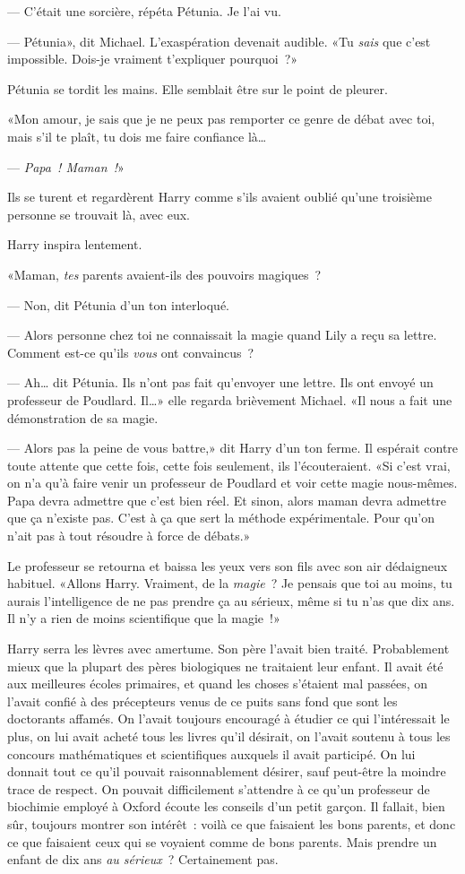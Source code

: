 --- C'était une sorcière, répéta Pétunia. Je l'ai vu.

--- Pétunia», dit Michael. L'exaspération devenait audible. «Tu \emph{sais} que c'est impossible. Dois-je vraiment t'expliquer pourquoi~?»

Pétunia se tordit les mains. Elle semblait être sur le point de pleurer.

«Mon amour, je sais que je ne peux pas remporter ce genre de débat avec toi, mais s'il te plaît, tu dois me faire confiance là…

--- \emph{Papa~! Maman~!}»

Ils se turent et regardèrent Harry comme s'ils avaient oublié qu'une troisième personne se trouvait là, avec eux.

Harry inspira lentement.

«Maman, \emph{tes} parents avaient-ils des pouvoirs magiques~?

--- Non, dit Pétunia d'un ton interloqué.

--- Alors personne chez toi ne connaissait la magie quand Lily a reçu sa lettre. Comment est-ce qu'ils \emph{vous} ont convaincus~?

--- Ah… dit Pétunia. Ils n'ont pas fait qu'envoyer une lettre. Ils ont envoyé un professeur de Poudlard. Il…» elle regarda brièvement Michael. «Il nous a fait une démonstration de sa magie.

--- Alors pas la peine de vous battre,» dit Harry d'un ton ferme. Il espérait contre toute attente que cette fois, cette fois seulement, ils l'écouteraient. «Si c'est vrai, on n'a qu'à faire venir un professeur de Poudlard et voir cette magie nous-mêmes. Papa devra admettre que c'est bien réel. Et sinon, alors maman devra admettre que ça n'existe pas. C'est à ça que sert la méthode expérimentale. Pour qu'on n'ait pas à tout résoudre à force de débats.»

Le professeur se retourna et baissa les yeux vers son fils avec son air dédaigneux habituel. «Allons Harry. Vraiment, de la \emph{magie}~? Je pensais que toi au moins, tu aurais l'intelligence de ne pas prendre ça au sérieux, même si tu n'as que dix ans. Il n'y a rien de moins scientifique que la magie~!»

Harry serra les lèvres avec amertume. Son père l'avait bien traité. Probablement mieux que la plupart des pères biologiques ne traitaient leur enfant. Il avait été aux meilleures écoles primaires, et quand les choses s'étaient mal passées, on l'avait confié à des précepteurs venus de ce puits sans fond que sont les doctorants affamés. On l'avait toujours encouragé à étudier ce qui l'intéressait le plus, on lui avait acheté tous les livres qu'il désirait, on l'avait soutenu à tous les concours mathématiques et scientifiques auxquels il avait participé. On lui donnait tout ce qu'il pouvait raisonnablement désirer, sauf peut-être la moindre trace de respect. On pouvait difficilement s'attendre à ce qu'un professeur de biochimie employé à Oxford écoute les conseils d'un petit garçon. Il fallait, bien sûr, toujours montrer son intérêt~: voilà ce que faisaient les bons parents, et donc ce que faisaient ceux qui se voyaient comme de bons parents. Mais prendre un enfant de dix ans \emph{au sérieux}~? Certainement pas.

